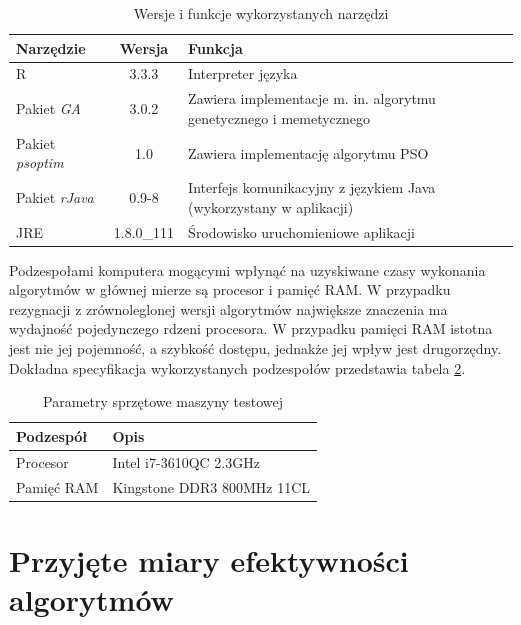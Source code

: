 \begin{table}[hb]
\label{table:wykorzystane_narzedzia}
\caption{Wersje i funkcje wykorzystanych narzędzi}
\begin{tabularx}{\textwidth}{|l|c|X|}
	\hline
	Narzędzie & Wersja & Funkcja \\
	\hline
	R & 3.3.3 & Interpreter języka \\
	Pakiet \emph{GA} & 3.0.2 & Zawiera implementacje m. in. algorytmu genetycznego i memetycznego \\
	Pakiet \emph{psoptim} & 1.0 & Zawiera implementację algorytmu PSO \\
	Pakiet \emph{rJava} & 0.9-8 & Interfejs komunikacyjny z językiem Java (wykorzystany w aplikacji) \\
	JRE & 1.8.0\_111 & Środowisko uruchomieniowe aplikacji \\
	\hline
	\end{tabularx}
\end{table}
\par
Podzespołami komputera mogącymi wpłynąć na uzyskiwane czasy wykonania algorytmów w głównej mierze są procesor i pamięć RAM. W przypadku rezygnacji z zrównoleglonej wersji algorytmów największe znaczenia ma wydajność pojedynczego rdzeni procesora. W przypadku pamięci RAM istotna jest nie jej pojemność, a szybkość dostępu, jednakże jej wpływ jest drugorzędny. Dokładna specyfikacja wykorzystanych podzespołów przedstawia tabela \ref{table:parametry_komputera}.
\begin{table}[hb]
\caption{Parametry sprzętowe maszyny testowej}
\label{table:parametry_komputera}
\begin{center}
\begin{tabular}{|l|l|}
	\hline
	Podzespół & Opis \\
	\hline
	Procesor & Intel i7-3610QC 2.3GHz \\
	Pamięć RAM & Kingstone DDR3 800MHz 11CL \\
	\hline
	\end{tabular}
\end{center}
\end{table}



\section{Przyjęte miary efektywności algorytmów}
\label{sec:przyjete_miary_efektywnosci_algorytmow}

